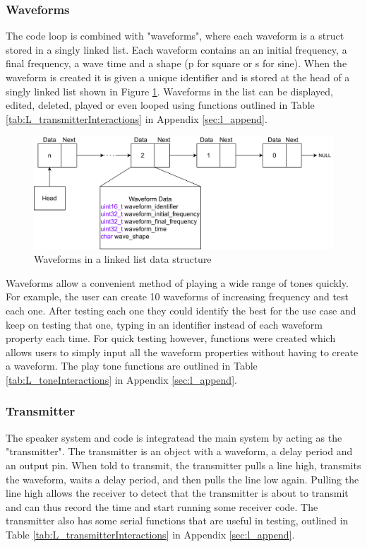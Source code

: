 \documentclass[12pt, a4paper]{article}
\begin{document}
\subsubsection{Waveforms}
The code loop is combined with "waveforms", where each waveform is a struct stored in a singly linked list. Each waveform contains an an initial frequency, a final frequency, a wave time and a shape (p for square or s for sine). When the waveform is created it is given a unique identifier and is stored at the head of a singly linked list shown in Figure \ref{fig:L_Waveforms}. Waveforms in the list can be displayed, edited, deleted, played or even looped using functions outlined in Table \ref{tab:L_transmitterInteractions} in Appendix \ref{sec:l_append}. \\

\begin{figure} [!htb]
	\hfill\includegraphics[width=\textwidth]{./images/speaker/L_Waveforms}\hspace{\fill}
	\caption{Waveforms in a linked list data structure}
	\label{fig:L_Waveforms}
\end{figure} 

Waveforms allow a convenient method of playing a wide range of tones quickly. For example, the user can create 10 waveforms of increasing frequency and test each one. After testing each one they could identify the best for the use case and keep on testing that one, typing in an identifier instead of each waveform property each time. For quick testing however, functions were created which allows users to simply input all the waveform properties without having to create a waveform. The play tone functions are outlined in Table \ref{tab:L_toneInteractions} in Appendix \ref{sec:l_append}. \\

\subsubsection{Transmitter}
The speaker system and code is integratead the main system by acting as the "transmitter". The transmitter is an object with a waveform, a delay period and an output pin. When told to transmit, the transmitter pulls a line high, transmits the waveform, waits a delay period, and then pulls the line low again. Pulling the line high allows the receiver to detect that the transmitter is about to transmit and can thus record the time and start running some receiver code. The transmitter also has some serial functions that are useful in testing, outlined in Table \ref{tab:L_transmitterInteractions} in Appendix \ref{sec:l_append}.
\pagebreak
\end{document}
